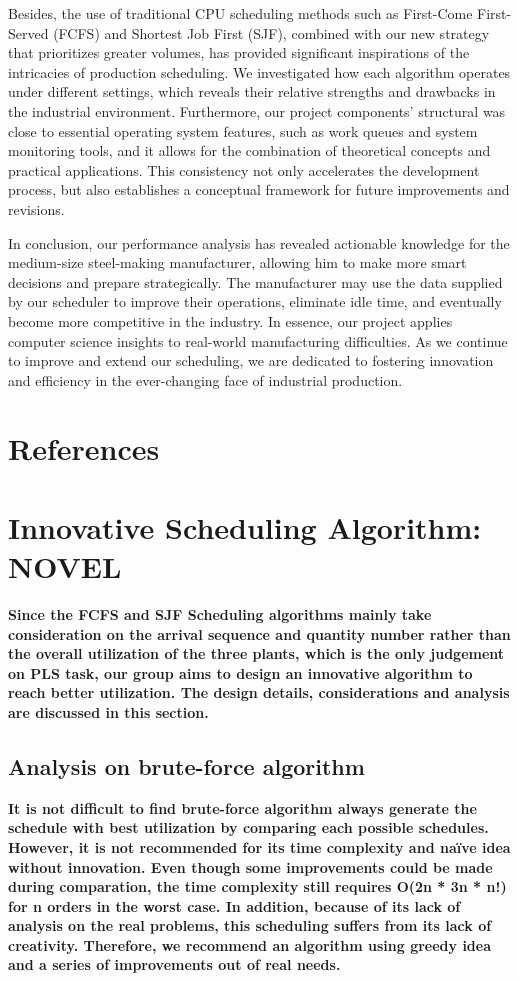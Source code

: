 \documentclass[conference]{IEEEtran}
\begin{document}
Besides, the use of traditional CPU scheduling methods such as First-Come First-Served (FCFS) and Shortest Job First (SJF), combined with our new strategy that prioritizes greater volumes, has provided significant inspirations of the intricacies of production scheduling. We investigated how each algorithm operates under different settings, which reveals their relative strengths and drawbacks in the industrial environment. Furthermore, our project components' structural was close to essential operating system features, such as work queues and system monitoring tools, and it allows for the combination of theoretical concepts and practical applications. This consistency not only accelerates the development process, but also establishes a conceptual framework for future improvements and revisions.

In conclusion, our performance analysis has revealed actionable knowledge for the medium-size steel-making manufacturer, allowing him to make more smart decisions and prepare strategically. The manufacturer may use the data supplied by our scheduler to improve their operations, eliminate idle time, and eventually become more competitive in the industry. In essence, our project applies computer science insights to real-world manufacturing difficulties. As we continue to improve and extend our scheduling, we are dedicated to fostering innovation and efficiency in the ever-changing face of industrial production. 

\section{\textbf{References}}



\section{\textbf{Innovative Scheduling Algorithm: NOVEL}}
\textbf{Since the FCFS and SJF Scheduling algorithms mainly take consideration on the arrival sequence and quantity number rather than the overall utilization of the three plants, which is the only judgement on PLS task, our group aims to design an innovative algorithm to reach better utilization. The design details, considerations and analysis are discussed in this section.}
\subsection{\textbf{Analysis on brute-force algorithm}}
\textbf{It is not difficult to find brute-force algorithm always generate the schedule with best utilization by comparing each possible schedules. However, it is not recommended for its time complexity and naïve idea without innovation. Even though some improvements could be made during comparation, the time complexity still requires O(2n * 3n * n!) for n orders in the worst case. In addition, because of its lack of analysis on the real problems, this scheduling suffers from its lack of creativity. Therefore, we recommend an algorithm using greedy idea and a series of improvements out of real needs.}
\end{document}
